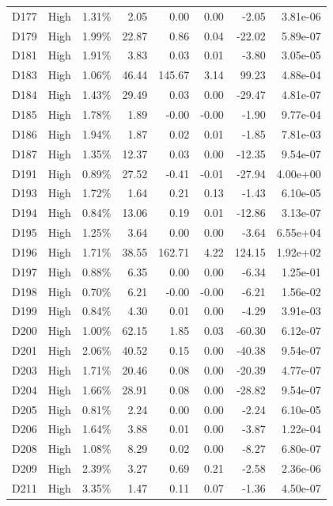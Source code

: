 \begin{tabular}{l l r r r r r r}
D177 & High & 1.31\% & 2.05 & 0.00 & 0.00 & -2.05 & 3.81e-06 \\
D179 & High & 1.99\% & 22.87 & 0.86 & 0.04 & -22.02 & 5.89e-07 \\
D181 & High & 1.91\% & 3.83 & 0.03 & 0.01 & -3.80 & 3.05e-05 \\
D183 & High & 1.06\% & 46.44 & 145.67 & 3.14 & 99.23 & 4.88e-04 \\
D184 & High & 1.43\% & 29.49 & 0.03 & 0.00 & -29.47 & 4.81e-07 \\
D185 & High & 1.78\% & 1.89 & -0.00 & -0.00 & -1.90 & 9.77e-04 \\
D186 & High & 1.94\% & 1.87 & 0.02 & 0.01 & -1.85 & 7.81e-03 \\
D187 & High & 1.35\% & 12.37 & 0.03 & 0.00 & -12.35 & 9.54e-07 \\
D191 & High & 0.89\% & 27.52 & -0.41 & -0.01 & -27.94 & 4.00e+00 \\
D193 & High & 1.72\% & 1.64 & 0.21 & 0.13 & -1.43 & 6.10e-05 \\
D194 & High & 0.84\% & 13.06 & 0.19 & 0.01 & -12.86 & 3.13e-07 \\
D195 & High & 1.25\% & 3.64 & 0.00 & 0.00 & -3.64 & 6.55e+04 \\
D196 & High & 1.71\% & 38.55 & 162.71 & 4.22 & 124.15 & 1.92e+02 \\
D197 & High & 0.88\% & 6.35 & 0.00 & 0.00 & -6.34 & 1.25e-01 \\
D198 & High & 0.70\% & 6.21 & -0.00 & -0.00 & -6.21 & 1.56e-02 \\
D199 & High & 0.84\% & 4.30 & 0.01 & 0.00 & -4.29 & 3.91e-03 \\
D200 & High & 1.00\% & 62.15 & 1.85 & 0.03 & -60.30 & 6.12e-07 \\
D201 & High & 2.06\% & 40.52 & 0.15 & 0.00 & -40.38 & 9.54e-07 \\
D203 & High & 1.71\% & 20.46 & 0.08 & 0.00 & -20.39 & 4.77e-07 \\
D204 & High & 1.66\% & 28.91 & 0.08 & 0.00 & -28.82 & 9.54e-07 \\
D205 & High & 0.81\% & 2.24 & 0.00 & 0.00 & -2.24 & 6.10e-05 \\
D206 & High & 1.64\% & 3.88 & 0.01 & 0.00 & -3.87 & 1.22e-04 \\
D208 & High & 1.08\% & 8.29 & 0.02 & 0.00 & -8.27 & 6.80e-07 \\
D209 & High & 2.39\% & 3.27 & 0.69 & 0.21 & -2.58 & 2.36e-06 \\
D211 & High & 3.35\% & 1.47 & 0.11 & 0.07 & -1.36 & 4.50e-07 \\

\end{tabular}
